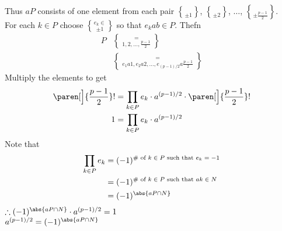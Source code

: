 Thus $aP$ consists of one element from each pair $\brace{\pm1}$, $\brace{\pm2}$, $\dotsc$, $\brace\pm\frac{p-1}{2}$. \\
For each $k\in P$ choose $e_k\in\brace{\pm1}$ so that $e_kab\in P$.
Thefn
\begin{align*}
P &= \brace{1,2,\dotsc,\frac{p-1}{2}} \\
&= \brace{e_1a1,e_2a2,\dotsc,e_{(p-1)/2}a\frac{p-1}{2}}
\end{align*}
Multiply the elements to get
\begin{align*}
\paren[\Big]{\frac{p-1}{2}}! &= \prod_{k\in P}e_k\cdot a^{(p-1)/2} \cdot \paren[\Big]{\frac{p-1}{2}}! \\
1 &= \prod_{k\in P}e_k\cdot a^{(p-1)/2}
\end{align*}
Note that
\begin{align*}
\prod_{k\in P} e_k &= (-1)^{\text{\# of $k\in P$ such that $e_k=-1$}} \\
&= (-1)^{\text{\# of $k\in P$ such that $ak\in N$}} \\
&= (-1)^{\abs{aP\cap N}}
\end{align*}
$\therefore(-1)^{\abs{aP\cap N}}\cdot a^{(p-1)/2}=1$ \\
$a^{(p-1)/2}=(-1)^{\abs{aP\cap N}}$

